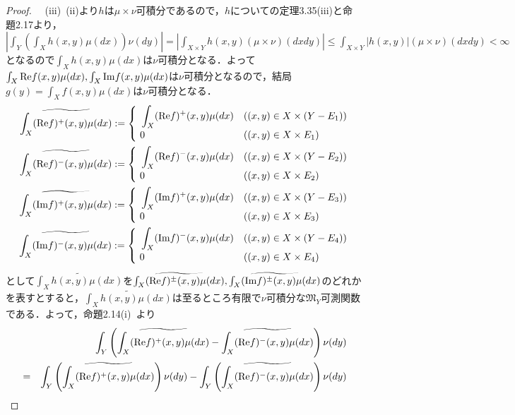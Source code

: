 \documentclass[a4paper,11pt]{jsarticle}
\newtheorem{proof}{証明}
\begin{document}
\begin{proof}
{\ }{\ }(iii){\ }(ii)より$h$は$\mu\times\nu$可積分であるので，$h$についての定理3.35(iii)と命題2.17より，$\left|\int_Y\left(\int_Xh(x,y)\mu(dx)\right)\nu(dy)\right|=\left|\int_{X\times Y}h(x,y)(\mu\times\nu)(dxdy)\right|\leq\int_{X\times Y}\left|h(x,y)\right|(\mu\times\nu)(dxdy)<\infty$となるので$\int_Xh(x,y)\mu(dx)$は$\nu$可積分となる．よって$\int_X{\rm Re}f(x,y)\mu(dx),\int_X{\rm Im}f(x,y)\mu(dx)$は$\nu$可積分となるので，結局$g(y)=\int_Xf(x,y)\mu(dx)$は$\nu$可積分となる．
\begin{eqnarray*}
\widetilde{\int_X({\rm Re}f)^+(x,y)\mu(dx)}:=\begin{cases}
\displaystyle
{\ }\int_X({\rm Re}f)^+(x,y)\mu(dx) & ((x,y)\in X\times (Y-E_1)) \\
{\ }0 & ((x,y)\in X\times E_1)
\end{cases} \\
\widetilde{\int_X({\rm Re}f)^-(x,y)\mu(dx)}:=\begin{cases}
\displaystyle
{\ }\int_X({\rm Re}f)^-(x,y)\mu(dx) & ((x,y)\in X\times (Y-E_2)) \\
{\ }0 & ((x,y)\in X\times E_2)
\end{cases} \\
\widetilde{\int_X({\rm Im}f)^+(x,y)\mu(dx)}:=\begin{cases}
\displaystyle
{\ }\int_X({\rm Im}f)^+(x,y)\mu(dx) & ((x,y)\in X\times (Y-E_3)) \\
{\ }0 & ((x,y)\in X\times E_3)
\end{cases} \\
\widetilde{\int_X({\rm Im}f)^-(x,y)\mu(dx)}:=\begin{cases}
\displaystyle
{\ }\int_X({\rm Im}f)^-(x,y)\mu(dx) & ((x,y)\in X\times (Y-E_4)) \\
{\ }0 & ((x,y)\in X\times E_4)
\end{cases}
\end{eqnarray*}
として$\widetilde{\int_X h(x,y)\mu(dx)}$を$\widetilde{\int_X({\rm Re}f)^\pm(x,y)\mu(dx)},\widetilde{\int_X({\rm Im}f)^\pm(x,y)\mu(dx)}$のどれかを表すとすると，$\widetilde{\int_X h(x,y)\mu(dx)}$は至るところ有限で$\nu$可積分な$\mathfrak{M}_Y$可測関数である．よって，命題2.14(i){\ }より
\begin{eqnarray*}
&&\int_Y\left(\widetilde{\int_X({\rm Re}f)^+(x,y)\mu(dx)}-\widetilde{\int_X({\rm Re}f)^-(x,y)\mu(dx)}\right)
\nu(dy) \\
&=&\int_Y\left(\widetilde{\int_X({\rm Re}f)^+(x,y)\mu(dx)}\right)\nu(dy)-\int_Y\left(\widetilde{\int_X({\rm Re}f)^-(x,y)\mu(dx)}\right)\nu(dy)
\end{eqnarray*}

\end{proof}
\end{document}
